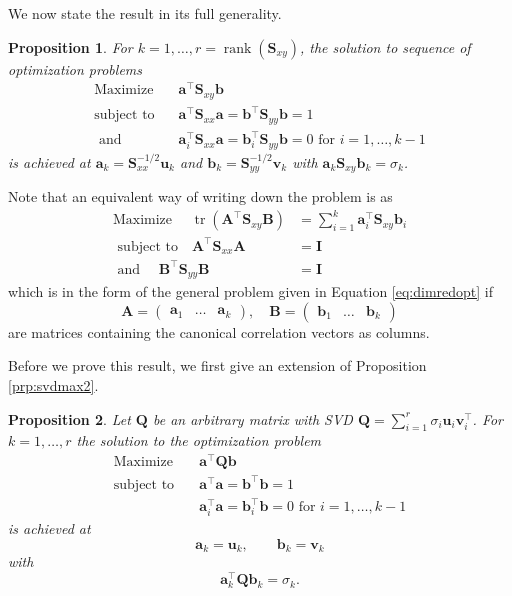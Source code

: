 \documentclass[
]{book}
\newtheorem{proposition}{Proposition}[chapter]
\theoremstyle{definition}
\theoremstyle{definition}
\theoremstyle{definition}
\theoremstyle{definition}
\theoremstyle{remark}
\begin{document}
We now state the result in its full generality.

\begin{proposition}
\protect\hypertarget{prp:ccafull}{}\label{prp:ccafull}For \(k=1, \ldots, r = \operatorname{rank}(\mathbf S_{xy})\), the solution to sequence of optimization problems
\begin{align}
\mbox{Maximize} \quad &\mathbf a^\top \mathbf S_{xy}\mathbf b\\
\mbox{subject to }  \;\;&\mathbf a^\top \mathbf S_{xx}\mathbf a=\mathbf b^\top\mathbf S_{yy} \mathbf b=1\\
\mbox{ and }\;\;\;&\mathbf a_i^\top \mathbf S_{xx}\mathbf a=\mathbf b_i^\top \mathbf S_{yy}\mathbf b= 0 \mbox{ for }i=1, \ldots, k-1
\end{align}
is achieved at \(\mathbf a_k = \mathbf S_{xx}^{-1/2}\mathbf u_k\) and \(\mathbf b_k=\mathbf S_{yy}^{-1/2}\mathbf v_k\) with \(\mathbf a_k \mathbf S_{xy}\mathbf b_k = \sigma_k\).
\end{proposition}

Note that an equivalent way of writing down the problem is as
\begin{align*}
\mbox{Maximize } \quad \operatorname{tr}(\mathbf A^\top \mathbf S_{xy}\mathbf B) &= \sum_{i=1}^k \mathbf a_i^\top \mathbf S_{xy}\mathbf b_i\\
\mbox{ subject to} \quad \mathbf A^\top \mathbf S_{xx}\mathbf A&=\mathbf I\\
\mbox{ and }\quad \mathbf B^\top \mathbf S_{yy}\mathbf B&= \mathbf I
\end{align*}
which is in the form of the general problem given in Equation \eqref{eq:dimredopt} if \[\mathbf A= \begin{pmatrix}\mathbf a_1&\ldots &\mathbf a_k\end{pmatrix}, \quad \mathbf B= \begin{pmatrix}\mathbf b_1&\ldots &\mathbf b_k\end{pmatrix}\]
are matrices containing the canonical correlation vectors as columns.

Before we prove this result, we first give an extension of Proposition \ref{prp:svdmax2}.

\begin{proposition}
\protect\hypertarget{prp:svdopt3}{}\label{prp:svdopt3}Let \(\mathbf Q\) be an arbitrary matrix with SVD \(\mathbf Q= \sum_{i=1}^r \sigma_i \mathbf u_i \mathbf v^\top_i\).
For \(k=1, \ldots, r\) the solution to the optimization problem
\begin{align}
\mbox{Maximize}\quad  &\mathbf a^\top \mathbf Q\mathbf b\\
\mbox{subject to} \quad &\mathbf a^\top \mathbf a= \mathbf b^\top \mathbf b=1\\
&\mathbf a_i^\top\mathbf a= \mathbf b_i^\top\mathbf b= 0 \mbox{ for } i = 1, \ldots, k-1
  \end{align}
is achieved at
\[\mathbf a_k=\mathbf u_k, \qquad \mathbf b_k = \mathbf v_k\]
with
\[\mathbf a_k^\top \mathbf Q\mathbf b_k = \sigma_k.\]
\end{proposition}
\end{document}
